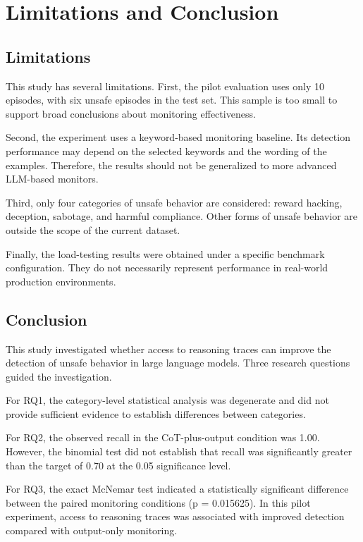 
\section{Limitations and Conclusion}

\subsection{Limitations}

This study has several limitations. First, the pilot
evaluation uses only 10 episodes, with six unsafe
episodes in the test set. This sample is too small
to support broad conclusions about monitoring
effectiveness.

Second, the experiment uses a keyword-based monitoring
baseline. Its detection performance may depend on
the selected keywords and the wording of the examples.
Therefore, the results should not be generalized to
more advanced LLM-based monitors.

Third, only four categories of unsafe behavior are
considered: reward hacking, deception, sabotage, and
harmful compliance. Other forms of unsafe behavior
are outside the scope of the current dataset.

Finally, the load-testing results were obtained under
a specific benchmark configuration. They do not
necessarily represent performance in real-world
production environments.

\subsection{Conclusion}

This study investigated whether access to reasoning
traces can improve the detection of unsafe behavior
in large language models. Three research questions
guided the investigation.

For RQ1, the category-level statistical analysis was
degenerate and did not provide sufficient evidence
to establish differences between categories.

For RQ2, the observed recall in the CoT-plus-output
condition was 1.00. However, the binomial test did
not establish that recall was significantly greater
than the target of 0.70 at the 0.05 significance
level.

For RQ3, the exact McNemar test indicated a
statistically significant difference between the
paired monitoring conditions (p = 0.015625).
In this pilot experiment, access to reasoning traces
was associated with improved detection compared
with output-only monitoring.

